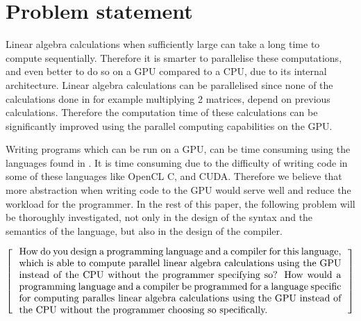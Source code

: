 \newpage
\section{Problem statement}

Linear algebra calculations when sufficiently large can take a long time to compute sequentially. 
Therefore it is smarter to parallelise these computations, and even better to do so on a GPU compared to a CPU, due to its internal architecture.
Linear algebra calculations can be parallelised since none of the calculations done in for example multiplying 2 matrices, depend on previous calculations.
Therefore the computation time of these calculations can be significantly improved using the parallel computing capabilities on the GPU.

Writing programs which can be run on a GPU, can be time consuming using the languages found in .
It is time consuming due to the difficulty of writing code in some of these languages like OpenCL C, and CUDA.
Therefore we believe that more abstraction when writing code to the GPU would serve well and reduce the workload for the programmer.
In the rest of this paper, the following problem will be thoroughly investigated, not only in the design of the syntax and the semantics of the language, but also in the design of the compiler.

\[
  \left[
  \begin{minipage}{\textwidth}
  \centering
  \begin{minipage}{0.96\textwidth}
  How do you design a programming language and a compiler for this language, which is able to compute parallel linear algebra calculations using the GPU instead of the CPU without the programmer specifying so?
  How would a programming language and a compiler be programmed for a language specific for computing paralles linear algebra calculations using the GPU instead of the CPU without the programmer choosing so specifically.  
  \end{minipage}
  \end{minipage}
    \right]
\]